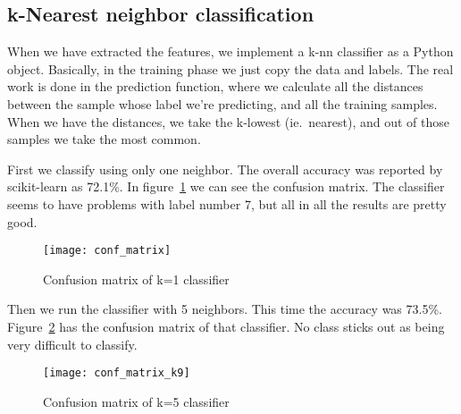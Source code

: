 \subsection{k-Nearest neighbor classification}

When we have extracted the features, we implement a k-nn classifier as a Python
object. Basically, in the training phase we just copy the data and labels. The
real work is done in the prediction function, where we calculate all the
distances between the sample whose label we're predicting, and all the training
samples. When we have the distances, we take the k-lowest (ie.\ nearest), and
out of those samples we take the most common.

First we classify using only one neighbor. The overall accuracy was reported by
scikit-learn as 72.1\%. In figure~\ref{fig:conf_mat} we can see the confusion
matrix. The classifier seems to have problems with label number 7, but all in
all the results are pretty good.
\begin{figure}[h]
  \centering
  \texttt{[image: conf\_matrix]}
  \caption{Confusion matrix of k=1 classifier}
\label{fig:conf_mat}
\end{figure}


Then we run the classifier with 5 neighbors. This time the accuracy was 73.5\%.
Figure~\ref{fig:conf_mat_k9} has the confusion matrix of that classifier. No
class sticks out as being very difficult to classify.
\begin{figure}[h]
  \centering
  \texttt{[image: conf\_matrix\_k9]}
  \caption{Confusion matrix of k=5 classifier}
\label{fig:conf_mat_k9}
\end{figure}









